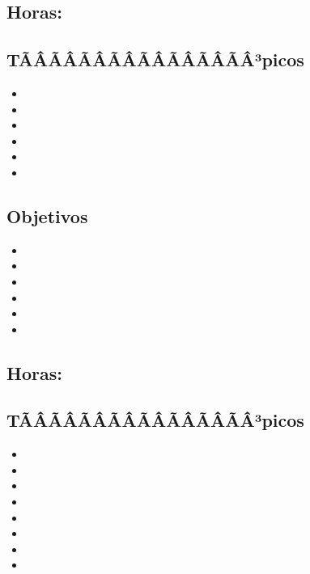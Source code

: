 \subsection*{Horas: \ARDOSHours}

\subsection*{TÃÂÃÂÃÂÃÂÃÂÃÂÃÂÃÂ³picos}
\begin{itemize}
	\item \ARDOSTopicBits
	\item \ARDOSTopicRepresentacion
	\item \ARDOSTopicSistemas
	\item \ARDOSTopicRepresentacionde
	\item \ARDOSTopicRepresentaciondedatos
	\item \ARDOSTopicRepresentacionderegistros
\end{itemize}

\subsection*{Objetivos}
\begin{itemize}
	\item \ARDOSObjUNO
	\item \ARDOSObjDOS
	\item \ARDOSObjTRES
	\item \ARDOSObjCUATRO
	\item \ARDOSObjCINCO
	\item \ARDOSObjSEIS
\end{itemize}

\subsection{\ARTRESDef}\label{sec:BOK-AR3}
\subsection*{Horas: \ARTRESHours}

\subsection*{TÃÂÃÂÃÂÃÂÃÂÃÂÃÂÃÂ³picos}
\begin{itemize}
	\item \ARTRESTopicOrganizacion
	\item \ARTRESTopicUnidad
	\item \ARTRESTopicConjuntos
	\item \ARTRESTopicLenguaje
	\item \ARTRESTopicFormatos
	\item \ARTRESTopicModos
	\item \ARTRESTopicLlamada
	\item \ARTRESTopicEntradas
\end{itemize}

